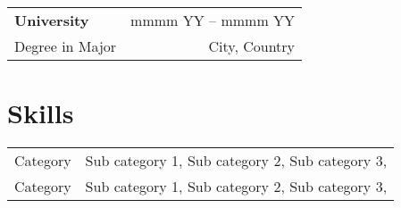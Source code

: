 \documentclass[11pt]{article}
\begin{document}
\vspace{0.1em}

\blinditemize[3]

\vspace{0.75em}

\begin{tabularx}{\textwidth}{@{}X r@{}} %
	\fontsize{14pt}{0pt}\selectfont\textbf{University} & mmmm YY – mmmm YY \\
	Degree in Major                                    & City, Country     \\
\end{tabularx}

\vspace{0.1em}

\blinditemize[3]

\vspace{0.5em}
\section*{Skills\hspace{0.5em}\hrulefill}

\begin{tabularx}{\textwidth}{@{}l L{\textwidth}}
	Category & Sub category 1, Sub category 2, Sub category 3, \\
	Category & Sub category 1, Sub category 2, Sub category 3, \\
\end{tabularx}

\newpage
\layout*
\end{document}
